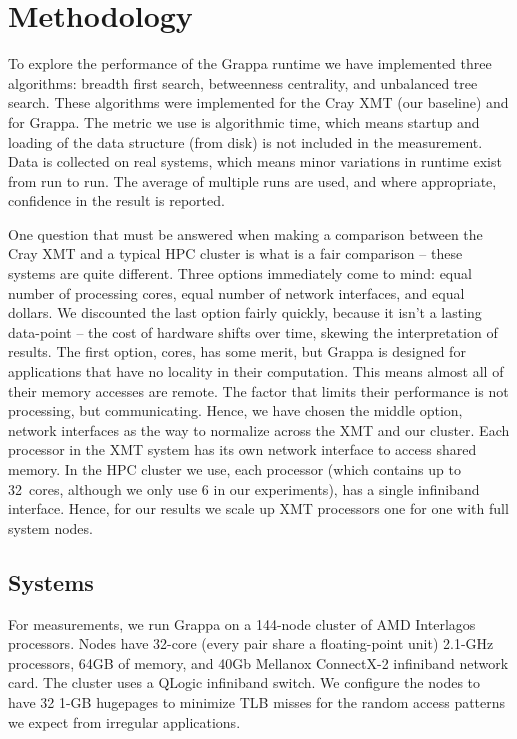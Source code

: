 \section{Methodology} \label{sec:method}


To explore the performance of the Grappa runtime we have implemented
three algorithms: breadth first search, betweenness centrality, and
unbalanced tree search.  These algorithms were implemented for the
Cray XMT (our baseline) and for Grappa.  The metric we use is
algorithmic time, which means startup and loading of the data
structure (from disk) is not included in the measurement.  Data is
collected on real systems, which means minor variations in runtime
exist from run to run.  The average of multiple runs are used, and
where appropriate, confidence in the result is reported.

One question that must be answered when making a comparison between the
Cray XMT and a typical HPC cluster is what is a fair comparison -- these
systems are quite different.  Three options immediately come to mind:
equal number of processing cores, equal number of network interfaces,
and equal dollars.  We discounted the last option fairly quickly,
because it isn't a lasting data-point -- the cost of hardware shifts
over time, skewing the interpretation of results.  The first option,
cores, has some merit, but Grappa is designed for applications that have
no locality in their computation.  This means almost all of their memory
accesses are remote.  The factor that limits their performance is not
processing, but communicating.  Hence, we have chosen the middle option,
network interfaces as the way to normalize across the XMT and our
cluster.  Each processor in the XMT system has its own network interface
to access shared memory.  In the HPC cluster we use, each processor
(which contains up to 32~cores, although we only use 6 in our
experiments), has a single infiniband interface.  Hence, for our results
we scale up XMT processors one for one with full system nodes.


\subsection{Systems}

For measurements, we run Grappa on a 144-node cluster of AMD Interlagos
processors. Nodes have 32-core (every pair share a floating-point unit)
2.1-GHz processors, 64GB of memory, and 40Gb Mellanox ConnectX-2
infiniband network card.   The cluster uses a QLogic infiniband switch.
We configure the nodes to have 32 1-GB hugepages to minimize TLB misses
for the random access patterns we expect from irregular applications.

